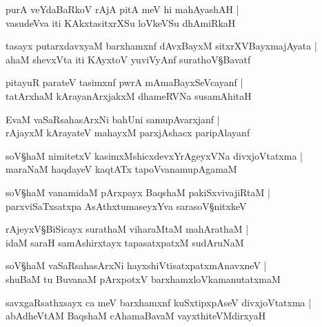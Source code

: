 \begin{shloka}
purA veYdaBaRkoV rAjA pitA meV hi mahAyashAH |\\
vasudeVva iti KAkxtasitxrXSu loVkeVSu dhAmiRkaH 
\end{shloka}

\begin{shloka}
tasayx putarxdavxyaM barxhamxnf dAvxBayxM sitxrXVBayxmajAyata |\\
ahaM shevxVta iti KAyxtoV yuviVyAnf surathoV\S Bavatf 
\end{shloka}

\begin{shloka}
pitayuR parateV tasimxnf pwrA mAmaBayxSeVcayanf |\\
tatArxhaM kArayanArxjakxM dhameRVNa susamAhitaH 
\end{shloka}

\begin{shloka}
EvaM vaSaRsahasArxNi bahUni samupAvarxjanf |\\
rAjayxM kArayateV mahayxM parxjAshacx paripAlayanf
\end{shloka}

\begin{shloka}
soV\S haM nimitetxV kasimxMshicxdevxYrAgeyxVNa divxjoVtatxma |\\
maraNaM haqdayeV kaqtATx tapoVvanamupAgamaM 
\end{shloka}

\begin{shloka}
soV\S haM vanamidaM pArxpayx BaqshaM pakiSxvivajiRtaM |\\
parxviSaTxsatxpa AsAthxtumaseyxYva sarasoV\S nitxkeV 
\end{shloka}

\begin{shloka}
rAjeyxV\S BiSicayx surathaM viharaMtaM mahArathaM |\\
idaM saraH samAshirxtayx tapasatxpatxM sudAruNaM 
\end{shloka}

\begin{shloka}
soV\S haM vaSaRsahasArxNi hayxshiVtisatxpatxmAnavxneV |\\
shuBaM tu BuvanaM pArxpotxV barxhamxloVkamanutatxmaM 
\end{shloka}

\begin{shloka}
savxgaRsathxsayx ca meV barxhamxnf kuSxtipxpAseV divxjoVtatxma |\\
abAdheVtAM BaqshaM cAhamaBavaM vayxthiteVMdirxyaH 
\end{shloka}


